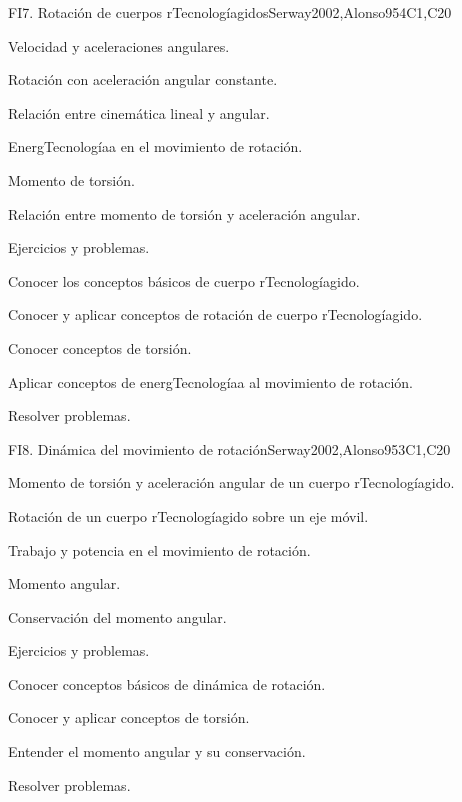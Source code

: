 \begin{syllabus}
\begin{unit}{FI7. Rotación de cuerpos rTecnologíagidos}{}{Serway2002,Alonso95}{4}{C1,C20}
\begin{topics}
      \item Velocidad y aceleraciones angulares.
      \item Rotación con aceleración angular constante.
      \item Relación entre cinemática lineal y angular.
      \item EnergTecnologíaa en el movimiento de rotación.
      \item Momento de torsión.
      \item Relación entre momento de torsión y aceleración angular.
      \item Ejercicios y problemas.
   \end{topics}

   \begin{learningoutcomes}
      \item Conocer los conceptos básicos de cuerpo rTecnologíagido.
      \item Conocer y aplicar conceptos de rotación de cuerpo rTecnologíagido.
      \item Conocer conceptos de torsión.
      \item Aplicar conceptos de energTecnologíaa al movimiento de rotación.
      \item Resolver problemas.
   \end{learningoutcomes}
\end{unit}

\begin{unit}{FI8. Dinámica del movimiento de rotación}{}{Serway2002,Alonso95}{3}{C1,C20}
\begin{topics}
      \item Momento de torsión y aceleración angular de un cuerpo rTecnologíagido.
      \item Rotación de un cuerpo rTecnologíagido sobre un eje móvil.
      \item Trabajo y potencia en el movimiento de rotación.
      \item Momento angular.
      \item Conservación del momento angular.
      \item Ejercicios y problemas.
    \end{topics}

   \begin{learningoutcomes}
      \item Conocer conceptos básicos de dinámica de rotación.
      \item Conocer y aplicar conceptos de torsión.
      \item Entender el momento angular y su conservación.
      \item Resolver problemas.
   \end{learningoutcomes}
\end{unit}



\begin{coursebibliography}
\end{coursebibliography}
\end{syllabus}
